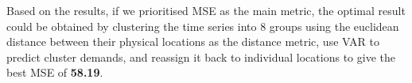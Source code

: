 \documentclass[nonblindrev,msom]{informs3} %
\begin{document}

\noindent Based on the results, if we prioritised MSE as the main metric, the optimal result could be obtained by clustering the time series into 8 groups using the euclidean distance between their physical locations as the distance metric, use VAR to predict cluster demands, and reassign it back to individual locations to give the best MSE of \textbf{58.19}. 

%
%
%
\end{document}
